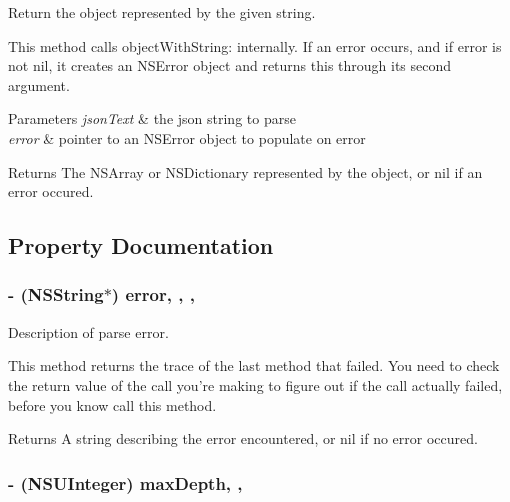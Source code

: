 Return the object represented by the given string. 

This method calls object\-With\-String\-: internally. If an error occurs, and if {\ttfamily error} is not nil, it creates an N\-S\-Error object and returns this through its second argument.


\begin{DoxyParams}{Parameters}
{\em json\-Text} & the json string to parse \\
\hline
{\em error} & pointer to an N\-S\-Error object to populate on error\\
\hline
\end{DoxyParams}
\begin{DoxyReturn}{Returns}
The N\-S\-Array or N\-S\-Dictionary represented by the object, or nil if an error occured. 
\end{DoxyReturn}


\subsection{Property Documentation}
\hypertarget{interface_s_b_json_parser_ad80719ec3d8be2bc45f06ec9c804997d}{
\subsubsection[{error}]{\setlength{\rightskip}{0pt plus 5cm}-\/ (N\-S\-String$\ast$) error\hspace{0.3cm}{\ttfamily [read]}, {\ttfamily [write]}, {\ttfamily [atomic]}, {\ttfamily [copy]}}}\label{interface_s_b_json_parser_ad80719ec3d8be2bc45f06ec9c804997d}


Description of parse error. 

This method returns the trace of the last method that failed. You need to check the return value of the call you're making to figure out if the call actually failed, before you know call this method.

\begin{DoxyReturn}{Returns}
A string describing the error encountered, or nil if no error occured. 
\end{DoxyReturn}
\hypertarget{interface_s_b_json_parser_a0378b4ce99a1caeddc4a05da37ca4ffa}{
\subsubsection[{max\-Depth}]{\setlength{\rightskip}{0pt plus 5cm}-\/ (N\-S\-U\-Integer) max\-Depth\hspace{0.3cm}{\ttfamily [read]}, {\ttfamily [write]}, {\ttfamily [atomic]}}}\label{interface_s_b_json_parser_a0378b4ce99a1caeddc4a05da37ca4ffa}


